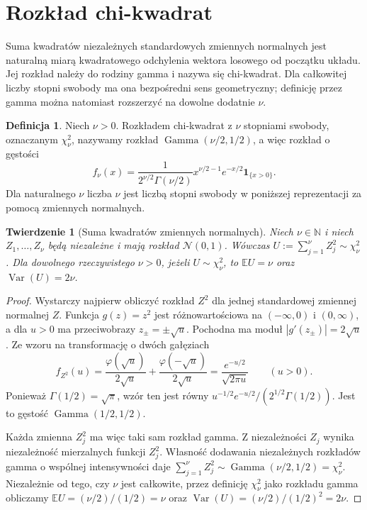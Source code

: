 \documentclass[11pt,a4paper,oneside]{report}
\numberwithin{equation}{chapter}
\theoremstyle{plain}
\newtheorem{twierdzenie}{Twierdzenie}[chapter]
\theoremstyle{definition}
\newtheorem{definicja}{Definicja}[chapter]
\theoremstyle{remark}
\newcommand{\N}{\mathbb{N}}
\newcommand{\E}{\mathbb{E}}
\newcommand{\Var}{\operatorname{Var}}
\newcommand{\ind}[1]{\mathbf{1}_{#1}}
\newcommand{\Gam}{\operatorname{Gamma}}
\newcommand{\Normal}{\mathcal{N}}
\begin{document}
\section{Rozkład chi-kwadrat}
Suma kwadratów niezależnych standardowych zmiennych normalnych
jest naturalną miarą kwadratowego odchylenia wektora losowego
od początku układu. Jej rozkład należy do rodziny gamma i
nazywa się chi-kwadrat. Dla całkowitej liczby stopni swobody
ma ona bezpośredni sens geometryczny; definicję przez gamma
można natomiast rozszerzyć na dowolne dodatnie $\nu$.

\begin{definicja}
Niech $\nu>0$. Rozkładem chi-kwadrat z $\nu$ stopniami swobody,
oznaczanym $\chi^2_\nu$, nazywamy rozkład
$\Gam(\nu/2,1/2)$, a więc rozkład o gęstości
\begin{equation}\label{eq:chisq}
f_\nu(x)=\frac{1}{2^{\nu/2}\Gamma(\nu/2)}
 x^{\nu/2-1}e^{-x/2}\ind{\{x>0\}}.
\end{equation}
Dla naturalnego $\nu$ liczba $\nu$ jest liczbą stopni swobody
w poniższej reprezentacji za pomocą zmiennych normalnych.
\end{definicja}

\begin{twierdzenie}[Suma kwadratów zmiennych normalnych]
Niech $\nu\in\N$ i niech $Z_1,\ldots,Z_\nu$ będą niezależne
i mają rozkład $\Normal(0,1)$. Wówczas
$U:=\sum_{j=1}^\nu Z_j^2\sim\chi^2_\nu$.
Dla dowolnego rzeczywistego $\nu>0$, jeżeli $U\sim\chi^2_\nu$,
to $\E U=\nu$ oraz $\Var(U)=2\nu$.
\end{twierdzenie}
\begin{proof}
Wystarczy najpierw obliczyć rozkład $Z^2$ dla jednej
standardowej zmiennej normalnej $Z$.
Funkcja $g(z)=z^2$ jest różnowartościowa na
$(-\infty,0)$ i $(0,\infty)$, a dla $u>0$ ma
przeciwobrazy $z_\pm=\pm\sqrt u$. Pochodna ma
moduł $|g'(z_\pm)|=2\sqrt u$. Ze wzoru
na transformację o dwóch gałęziach
\[
f_{Z^2}(u)=\frac{\varphi(\sqrt u)}{2\sqrt u}
+\frac{\varphi(-\sqrt u)}{2\sqrt u}
=\frac{e^{-u/2}}{\sqrt{2\pi u}}
\qquad(u>0).
\]
Ponieważ $\Gamma(1/2)=\sqrt\pi$, wzór ten jest równy
$u^{-1/2}e^{-u/2}/(2^{1/2}\Gamma(1/2))$.
Jest to gęstość $\Gam(1/2,1/2)$.

Każda zmienna $Z_j^2$ ma więc taki sam rozkład gamma.
Z niezależności $Z_j$ wynika niezależność mierzalnych
funkcji $Z_j^2$. Własność dodawania niezależnych
rozkładów gamma o wspólnej intensywności daje
$\sum_{j=1}^\nu Z_j^2\sim\Gam(\nu/2,1/2)=\chi^2_\nu$.
Niezależnie od tego, czy $\nu$ jest całkowite,
przez definicję $\chi^2_\nu$ jako rozkładu gamma
obliczamy $\E U=(\nu/2)/(1/2)=\nu$ oraz
$\Var(U)=(\nu/2)/(1/2)^2=2\nu$.
\end{proof}
\end{document}
